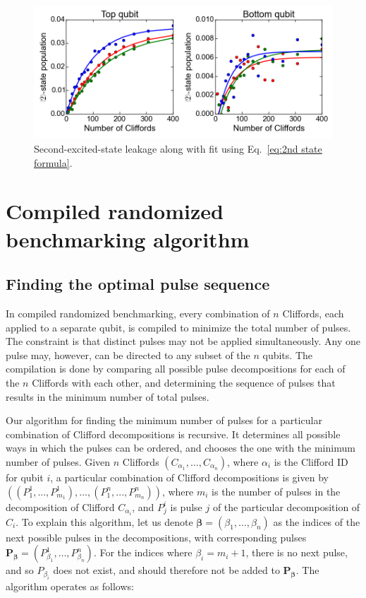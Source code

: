         \begin{figure}[h]
          \centering
          \includegraphics[width=\textwidth]{Figures/Randomized benchmarking/2nd-state leakage 2Q.png}
          \caption{Second-excited-state leakage along with fit using Eq.~\ref{eq:2nd state formula}.}
          \label{fig:second state leakage 2Q}
        \end{figure}

\chapter{Compiled randomized benchmarking algorithm}
  \label{sec:compiled randomized benchmarking algorithm}
  \section{Finding the optimal pulse sequence}
    In compiled randomized benchmarking, every combination of $n$ Cliffords, each applied to a separate qubit, is compiled to minimize the total number of pulses. The constraint is that distinct pulses may not be applied simultaneously. Any one pulse may, however, can be directed to any subset of the $n$ qubits. The compilation is done by comparing all possible pulse decompositions for each of the $n$ Cliffords with each other, and determining the sequence of pulses that results in the minimum number of total pulses.

    Our algorithm for finding the minimum number of pulses for a particular combination of Clifford decompositions is recursive. It determines all possible ways in which the pulses can be ordered, and chooses the one with the minimum number of pulses. Given $n$ Cliffords $\left(C_{\alpha_1}, \dots, C_{\alpha_n}\right)$, where $\alpha_i$ is the Clifford ID for qubit $i$, a particular combination of Clifford decompositions is given by $\left(\left( P_1^1, ..., P_{m_1}^1 \right) , ..., \left(P_1^n, ..., P_{m_n}^n\right)\right)$, where $m_i$ is the number of pulses in the decomposition of Clifford $C_{\alpha_i}$, and $P_j^i$ is pulse $j$ of the particular decomposition of $C_i$. To explain this algorithm, let us denote $\bm{\beta}=\left(\beta_1, \dots, \beta_n\right)$ as the indices of the next possible pulses in the decompositions, with corresponding pulses $\bm{P_\bm{\beta}}=\left( P_{\beta_1}^1, \dots, P_{\beta_n}^n \right)$. For the indices where $\beta_i=m_i + 1$, there is no next pulse, and so $P_{\beta_i}$ does not exist, and should therefore not be added to $\bm{P_\bm{\beta}}$. The algorithm operates as follows:

